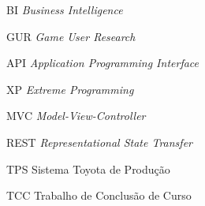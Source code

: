 \begin{siglas}
  \item[BI] \textit{Business Intelligence}
  \item[GUR] \textit{Game User Research}
  \item[API] \textit{Application Programming Interface}
  \item[XP] \textit{Extreme Programming}
  \item[MVC] \textit{Model-View-Controller}
  \item[REST] \textit{Representational State Transfer}
  \item[TPS] Sistema Toyota de Produção
  \item[TCC] Trabalho de Conclusão de Curso
\end{siglas}
